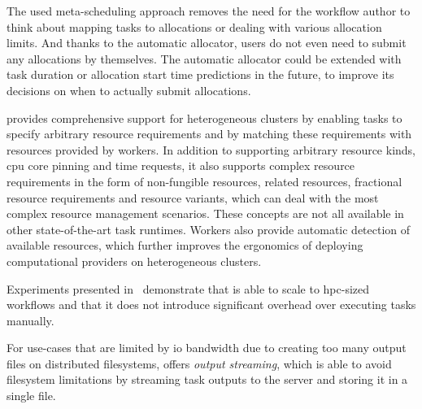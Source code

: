 \begin{description}[wide=0pt]
	\item[Allocation manager] The used meta-scheduling approach removes the need for the workflow author to think about mapping
		tasks to allocations or dealing with various allocation limits. And thanks to the automatic
		allocator, users do not even need to submit any allocations by themselves. The automatic allocator
		could be extended with task duration or allocation start time predictions in the future, to improve
		its decisions on when to actually submit allocations.
	\item[Cluster heterogeneity] \hyperqueue{} provides comprehensive support for heterogeneous
		clusters by enabling tasks to specify arbitrary resource requirements and by matching these
		requirements with resources provided by workers. In addition to supporting arbitrary resource
		kinds, \gls{cpu} core pinning and time requests, it also supports complex resource
		requirements in the form of non-fungible resources, related resources, fractional resource
		requirements and resource variants, which can deal with the most complex resource management
		scenarios. These concepts are not all available in other state-of-the-art task runtimes. Workers
		also provide automatic detection of available resources, which further improves the ergonomics of
		deploying computational providers on heterogeneous clusters.
	\item[Performance and scalability] Experiments presented in~ demonstrate that \hyperqueue{} is
		able to scale to \gls{hpc}-sized workflows and that it does not introduce
		significant overhead over executing tasks manually.

		For use-cases that are limited by \gls{io} bandwidth due to creating too many
		output files on distributed filesystems, \hyperqueue{} offers
		\emph{output streaming}, which is able to avoid filesystem limitations by streaming task outputs
		to the server and storing it in a single file.


\end{description}
